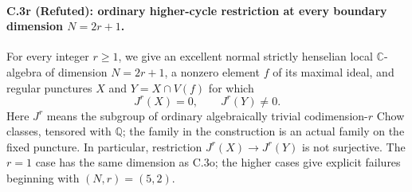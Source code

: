 \paragraph{C.3r (Refuted): ordinary higher-cycle restriction at every boundary dimension $N=2r+1$.}
For every integer $r\ge1$, we give an excellent normal strictly
henselian local $\mathbb C$-algebra of dimension $N=2r+1$, a nonzero
element $f$ of its maximal ideal, and regular punctures $X$ and
$Y=X\cap V(f)$ for which
\[
 J^r(X)=0,\qquad J^r(Y)\ne0.
\]
Here $J^r$ means the subgroup of ordinary algebraically trivial
codimension-$r$ Chow classes, tensored with $\mathbb Q$; the family
in the construction is an actual family on the fixed puncture.
In particular, restriction $J^r(X)\to J^r(Y)$ is not surjective.
The $r=1$ case has the same dimension as C.3o; the higher cases
give explicit failures beginning with $(N,r)=(5,2)$.

